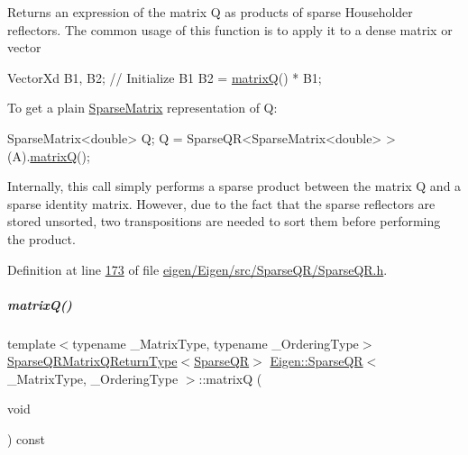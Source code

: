 \begin{DoxyReturn}{Returns}
an expression of the matrix Q as products of sparse Householder reflectors. The common usage of this function is to apply it to a dense matrix or vector 
\begin{DoxyCode}
VectorXd B1, B2;
\textcolor{comment}{// Initialize B1}
B2 = \hyperlink{group___sparse_q_r___module_ae1cc0a836c177d4f42600f8639354be1}{matrixQ}() * B1;
\end{DoxyCode}

\end{DoxyReturn}
To get a plain \hyperlink{group___sparse_core___module_class_eigen_1_1_sparse_matrix}{Sparse\+Matrix} representation of Q\+: 
\begin{DoxyCode}
SparseMatrix<double> Q;
Q = SparseQR<SparseMatrix<double> >(A).\hyperlink{group___sparse_q_r___module_ae1cc0a836c177d4f42600f8639354be1}{matrixQ}();
\end{DoxyCode}
 Internally, this call simply performs a sparse product between the matrix Q and a sparse identity matrix. However, due to the fact that the sparse reflectors are stored unsorted, two transpositions are needed to sort them before performing the product. 

Definition at line \hyperlink{eigen_2_eigen_2src_2_sparse_q_r_2_sparse_q_r_8h_source_l00173}{173} of file \hyperlink{eigen_2_eigen_2src_2_sparse_q_r_2_sparse_q_r_8h_source}{eigen/\+Eigen/src/\+Sparse\+Q\+R/\+Sparse\+Q\+R.\+h}.

\mbox{\label{group___sparse_q_r___module_ae1cc0a836c177d4f42600f8639354be1}} 
\subparagraph{\texorpdfstring{matrix\+Q()}{matrixQ()}\hspace{0.1cm}{\footnotesize\ttfamily [2/2]}}
{\footnotesize\ttfamily template$<$typename \+\_\+\+Matrix\+Type, typename \+\_\+\+Ordering\+Type$>$ \\
\hyperlink{struct_eigen_1_1_sparse_q_r_matrix_q_return_type}{Sparse\+Q\+R\+Matrix\+Q\+Return\+Type}$<$\hyperlink{group___sparse_q_r___module_class_eigen_1_1_sparse_q_r}{Sparse\+QR}$>$ \hyperlink{group___sparse_q_r___module_class_eigen_1_1_sparse_q_r}{Eigen\+::\+Sparse\+QR}$<$ \+\_\+\+Matrix\+Type, \+\_\+\+Ordering\+Type $>$\+::matrixQ (\begin{DoxyParamCaption}\item[{void}]{ }\end{DoxyParamCaption}) const\hspace{0.3cm}{\ttfamily [inline]}}

